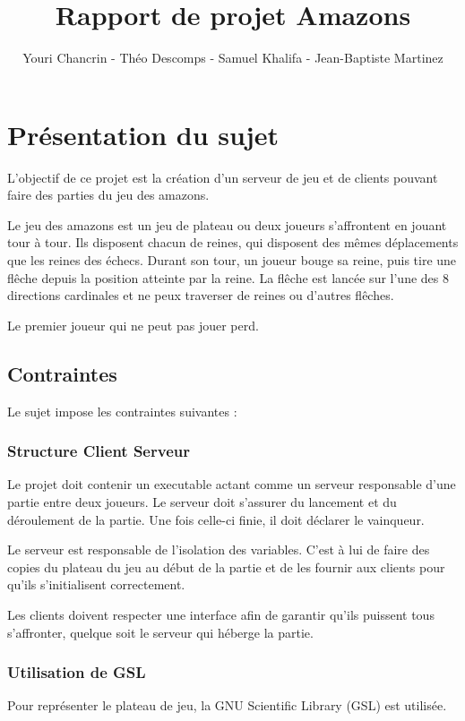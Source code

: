 \documentclass{article}
\author{Youri Chancrin - Théo Descomps - Samuel Khalifa - Jean-Baptiste Martinez}
\title{Rapport de projet Amazons}
\begin{document}
\maketitle

\section{Présentation du sujet}

L'objectif de ce projet est la création d'un serveur de jeu et de clients pouvant faire des parties 
du jeu des amazons.

Le jeu des amazons est un jeu de plateau ou deux joueurs s'affrontent en jouant tour à tour.
Ils disposent chacun de reines, qui disposent des mêmes déplacements que les reines des échecs.
Durant son tour, un joueur bouge sa reine, puis tire une flêche depuis la position atteinte par la reine.
La flêche est lancée sur l'une des 8 directions cardinales et ne peux traverser de reines ou d'autres flêches.

Le premier joueur qui ne peut pas jouer perd.

\subsection{Contraintes}
Le sujet impose les contraintes suivantes :

\subsubsection{Structure Client Serveur}

Le projet doit contenir un executable actant comme un serveur responsable d'une partie entre deux joueurs.
Le serveur doit s'assurer du lancement et du déroulement de la partie. Une fois celle-ci finie, 
il doit déclarer le vainqueur.

Le serveur est responsable de l'isolation des variables. 
C'est à lui de faire des copies du plateau du jeu au début de la partie et de les fournir aux clients 
pour qu'ils s'initialisent correctement.

Les clients doivent respecter une interface afin de garantir qu'ils puissent tous s'affronter,
quelque soit le serveur qui héberge la partie.

\subsubsection{Utilisation de GSL}

Pour représenter le plateau de jeu, la GNU Scientific Library (GSL) est utilisée.
\end{document}
